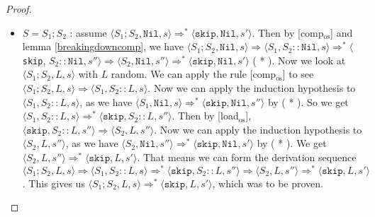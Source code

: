 \begin{proof}
\begin{itemize}
    \item $S = S_1; S_2$ : assume $\langle S_1;S_2, \texttt{Nil}, s \rangle \Rightarrow ^{*} \langle \texttt{skip}, \texttt{Nil}, s' \rangle$. Then by [comp$_{\textrm{os}}$] and lemma \ref{breakingdowncomp}, we have $\langle S_1;S_2, \texttt{Nil}, s \rangle \Rightarrow \langle S_1, S_2::\texttt{Nil}, s \rangle \Rightarrow ^{*} \langle$ \texttt{skip}, $S_2::\texttt{Nil}, s'' \rangle \Rightarrow \langle S_2, \texttt{Nil}, s'' \rangle \Rightarrow ^{*} \langle \texttt{skip}, \texttt{Nil}, s' \rangle$ ( * ). Now we look at $\langle S_1;S_2, L, s \rangle$ with $L$ random. We can apply the rule [comp$_{\textrm{os}}$] to see $\langle S_1;S_2, L, s \rangle \Rightarrow \langle S_1, S_2::L, s \rangle$. Now we can apply the induction hypothesis to $\langle S_1, S_2::L, s \rangle$, as we have $\langle S_1, \texttt{Nil}, s \rangle \Rightarrow ^{*} \langle \texttt{skip}, \texttt{Nil}, s'' \rangle$ by ( * ). So we get $\langle S_1, S_2::L, s \rangle \Rightarrow ^{*} \langle \texttt{skip}, S_2::L, s'' \rangle$. Then by [load$_{\textrm{os}}$], $\langle \texttt{skip}, S_2::L, s'' \rangle \Rightarrow \langle S_2 , L , s''\rangle$. Now we can apply the induction hypothesis to $\langle S_2 , L , s''\rangle$, as we have $\langle S_2, \texttt{Nil}, s''\rangle \Rightarrow ^{*} \langle \texttt{skip}, \texttt{Nil}, s'\rangle$ by ( * ). We get $\langle S_2 , L , s''\rangle \Rightarrow ^{*} \langle \texttt{skip}, L, s'\rangle$. That means we can form the derivation sequence $\langle S_1;S_2, L, s \rangle \Rightarrow \langle S_1, S_2::L, s \rangle \Rightarrow ^{*} \langle \texttt{skip}, S_2::L, s'' \rangle \Rightarrow \langle S_2 , L , s''\rangle \Rightarrow ^{*} \langle \texttt{skip}, L, s'\rangle$. This gives us $\langle S_1;S_2, L, s \rangle  \Rightarrow ^{*} \langle \texttt{skip}, L, s'\rangle$, which was to be proven. 
        

\end{itemize}
\end{proof}
